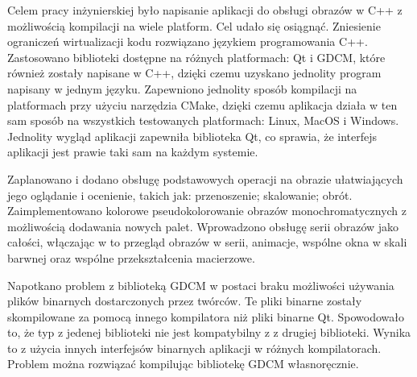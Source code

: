 \par
Celem pracy inżynierskiej było napisanie aplikacji do obsługi obrazów \DICOM w C++ z możliwością kompilacji na wiele platform.
Cel udało się osiągnąć.
Zniesienie ograniczeń wirtualizacji kodu rozwiązano językiem programowania C++.
Zastosowano biblioteki dostępne na różnych platformach: Qt i GDCM, które również zostały napisane w C++, dzięki czemu uzyskano jednolity program napisany w jednym języku.
Zapewniono jednolity sposób kompilacji na platformach przy użyciu narzędzia CMake, dzięki czemu aplikacja działa w ten sam sposób na wszystkich testowanych platformach: Linux, MacOS i Windows.
Jednolity wygląd aplikacji zapewniła biblioteka Qt, co sprawia, że interfejs aplikacji jest prawie taki sam na każdym systemie.
\par
Zaplanowano i dodano obsługę podstawowych operacji na obrazie ułatwiających jego oglądanie i ocenienie, takich jak: przenoszenie; skalowanie; obrót.
Zaimplementowano kolorowe pseudokolorowanie obrazów monochromatycznych z możliwością dodawania nowych palet.
Wprowadzono obsługę serii obrazów jako całości, włączając w to przegląd obrazów w serii, animacje, wspólne okna w skali barwnej oraz wspólne przekształcenia macierzowe.
\par
Napotkano problem z biblioteką GDCM w postaci braku możliwości używania plików binarnych dostarczonych przez twórców.
Te pliki binarne zostały skompilowane za pomocą innego kompilatora niż pliki binarne Qt.
Spowodowało to, że typ  z jedenej biblioteki nie jest kompatybilny z  z drugiej biblioteki.
Wynika to z użycia innych interfejsów binarnych aplikacji  w różnych kompilatorach.
Problem można rozwiązać kompilując bibliotekę GDCM własnoręcznie.